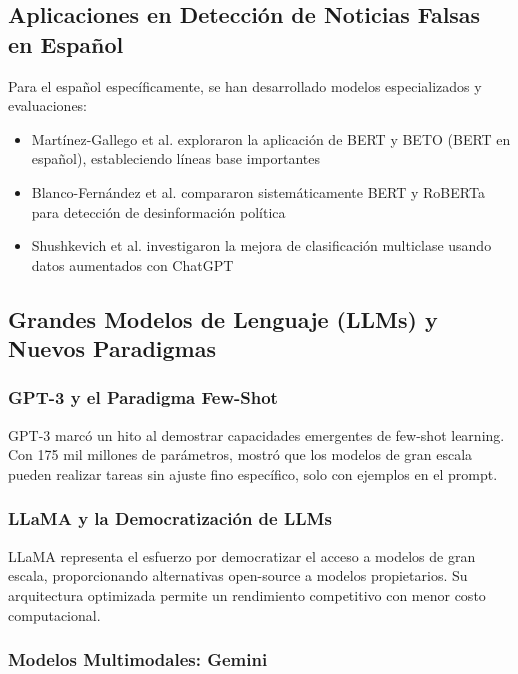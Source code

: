 \subsection{Aplicaciones en Detección de Noticias Falsas en Español}

Para el español específicamente, se han desarrollado modelos especializados y evaluaciones:
\begin{itemize}
    \item Martínez-Gallego et al. \cite{martinez2021fake} exploraron la aplicación de BERT y BETO (BERT en español), estableciendo líneas base importantes
    \item Blanco-Fernández et al. \cite{blanco2024enhancing} compararon sistemáticamente BERT y RoBERTa para detección de desinformación política
    \item Shushkevich et al. \cite{shushkevich2023improving} investigaron la mejora de clasificación multiclase usando datos aumentados con ChatGPT
\end{itemize}

\subsection{Grandes Modelos de Lenguaje (LLMs) y Nuevos Paradigmas}

\subsubsection{GPT-3 y el Paradigma Few-Shot}

GPT-3 \cite{brown2020language} marcó un hito al demostrar capacidades emergentes de few-shot learning. Con 175 mil millones de parámetros, mostró que los modelos de gran escala pueden realizar tareas sin ajuste fino específico, solo con ejemplos en el prompt.

\subsubsection{LLaMA y la Democratización de LLMs}

LLaMA \cite{touvron2023llama} representa el esfuerzo por democratizar el acceso a modelos de gran escala, proporcionando alternativas open-source a modelos propietarios. Su arquitectura optimizada permite un rendimiento competitivo con menor costo computacional.

\subsubsection{Modelos Multimodales: Gemini}

